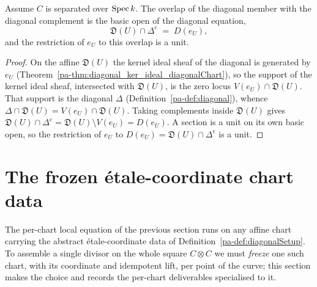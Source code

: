 \begin{theorem}
  \label{pa-thm:diagonalChart_inf_diagonalComplement}
  \leanok

  Assume \(C\) is separated over \(\operatorname{Spec} k\). The overlap of the diagonal member with the diagonal
  complement is the basic open of the diagonal equation,
  \[
    \mathfrak D(U) \cap \Delta^{\mathrm{c}} \;=\; D(e_U),
  \]
  and the restriction of \(e_U\) to this overlap is a unit.
\end{theorem}
\begin{proof}
  \leanok
  On the affine \(\mathfrak D(U)\) the kernel ideal sheaf of the diagonal is generated by \(e_U\)
  (Theorem~\ref{pa-thm:diagonal_ker_ideal_diagonalChart}), so the support of the kernel ideal sheaf,
  intersected with \(\mathfrak D(U)\), is the zero locus \(V(e_U) \cap \mathfrak D(U)\). That
  support is the diagonal \(\Delta\) (Definition~\ref{pa-def:diagonal}), whence
  \(\Delta \cap \mathfrak D(U) = V(e_U) \cap \mathfrak D(U)\). Taking complements inside
  \(\mathfrak D(U)\) gives
  \(\mathfrak D(U) \cap \Delta^{\mathrm{c}} = \mathfrak D(U) \setminus V(e_U) = D(e_U)\). A section
  is a unit on its own basic open, so the restriction of \(e_U\) to
  \(D(e_U) = \mathfrak D(U) \cap \Delta^{\mathrm{c}}\) is a unit.
\end{proof}

\section{The frozen étale-coordinate chart data}

The per-chart local equation of the previous section runs on any affine chart carrying the
abstract étale-coordinate data of Definition~\ref{pa-def:diagonalSetup}. To assemble a single
divisor on the whole square \(C \otimes C\) we must \emph{freeze} one such chart, with its
coordinate and idempotent lift, per point of the curve; this section makes the choice and
records the per-chart deliverables specialised to it.

